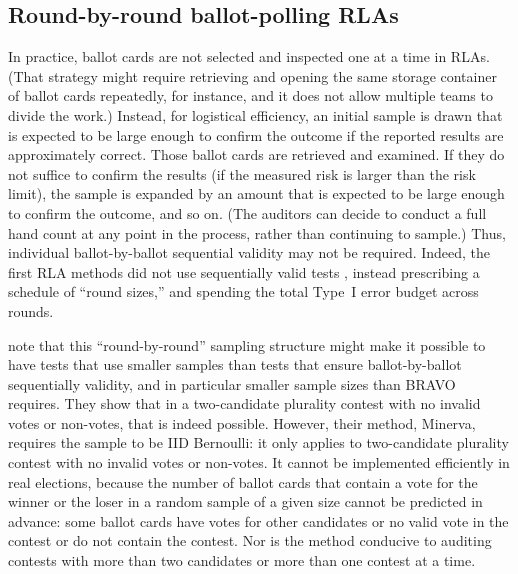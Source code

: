 \documentclass[12pt,runningheads]{llncs}
\begin{document}
{\subsection{Round-by-round ballot-polling RLAs}
In practice, ballot cards are not selected and inspected one at a time in RLAs.
(That strategy might require retrieving and opening the same storage container of ballot cards repeatedly, for instance, and it does not allow
multiple teams to divide the work.)
Instead, for logistical efficiency, an initial sample is drawn that is expected to be large enough to confirm the outcome if the 
reported results are approximately correct.
Those ballot cards are retrieved and examined.
If they do not suffice to confirm the results (if the measured risk is larger than the risk limit), 
the sample is expanded by an amount that is expected to be large enough
to confirm the outcome, and so on.
(The auditors can decide to conduct a full hand count at any point in the process, rather than continuing to sample.)
Thus, individual ballot-by-ballot sequential validity may not be required.
Indeed, the first RLA methods did not use sequentially valid tests \cite{stark08a,stark09a},
instead prescribing a schedule of ``round sizes,'' and spending the total Type~I error budget across rounds.

\cite{zagorskiEtal21} note that this ``round-by-round'' sampling structure might make it possible to have tests that 
use smaller samples than tests that ensure ballot-by-ballot sequentially validity, and in particular smaller sample sizes than BRAVO
requires.
They show that in a two-candidate plurality contest with no invalid votes or non-votes, that is indeed
possible.
However, their method, Minerva, requires the sample to be IID Bernoulli:
it only applies to  two-candidate plurality contest with no invalid votes or non-votes.
It cannot be implemented efficiently in real elections, because the number of ballot cards that contain a vote for the winner or the
loser in a random sample of a given size cannot be predicted in advance: some ballot cards have votes for other candidates or no valid vote in the contest or do not contain the contest.
Nor is the method conducive to auditing contests with more than two candidates or more than one contest at a time.

}
\end{document}
